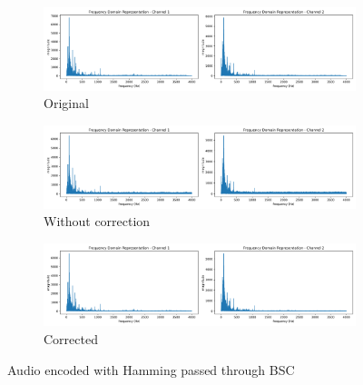 \documentclass{article}
\begin{document}
\begin{figure}
    \centering
    \begin{subfigure}[b]{\textwidth}
        \centering
        \includegraphics[width=\textwidth]{../Result/wav-frequency-domain-TX.png}
        \caption{Original}
        \label{fig:f-audio-hamming-bsc-original}
    \end{subfigure}
    \begin{subfigure}[b]{\textwidth}
        \centering
        \includegraphics[width=\textwidth]{../Result/wav-frequency-domain-RX.png}
        \caption{Without correction}
        \label{fig:f-audio-hamming-bsc-no-correction}
    \end{subfigure}
    \begin{subfigure}[b]{\textwidth}
        \centering
        \includegraphics[width=\textwidth]{../Result/wav-frequency-domain-RX-corrected.png}
        \caption{Corrected}
        \label{fig:f-audio-hamming-bsc-corrected}
    \end{subfigure}
       \caption{Audio encoded with Hamming passed through BSC}
       \label{fig:f-audio-hamming-bsc}
\end{figure}
\end{document}
